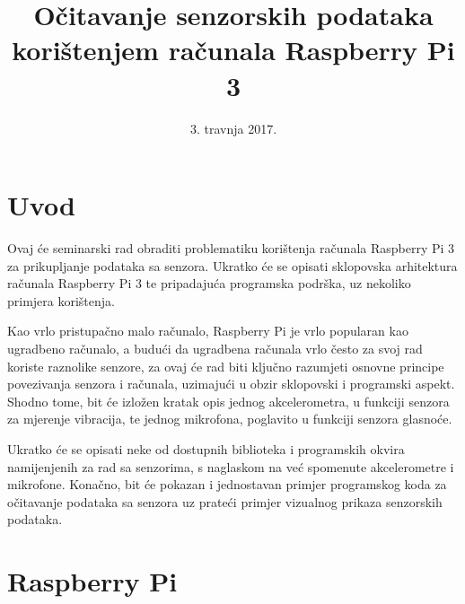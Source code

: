 \documentclass[12pt,a4paper]{article}
\begin{document}
	\title{Očitavanje senzorskih podataka korištenjem računala Raspberry Pi 3}


	\date{\vspace{-5ex} 3. travnja 2017.}
	\maketitle

	\tableofcontents
	\newpage

\section{Uvod}
Ovaj će seminarski rad obraditi problematiku korištenja računala Raspberry Pi 3 za prikupljanje podataka sa senzora. Ukratko će se opisati sklopovska arhitektura računala Raspberry Pi 3 te pripadajuća programska podrška, uz nekoliko primjera korištenja. \\ \par
Kao vrlo pristupačno malo računalo, Raspberry Pi je vrlo popularan kao ugradbeno računalo, a budući da ugradbena računala vrlo često za svoj rad koriste raznolike senzore, za ovaj će rad biti ključno razumjeti osnovne principe povezivanja senzora i računala, uzimajući u obzir sklopovski i programski aspekt. Shodno tome, bit će izložen kratak opis jednog akcelerometra, u funkciji senzora za mjerenje vibracija, te jednog mikrofona, poglavito u funkciji senzora glasnoće. \\ \par
Ukratko će se opisati neke od dostupnih biblioteka i programskih okvira namijenjenih za rad sa senzorima, s naglaskom na već spomenute akcelerometre i mikrofone. Konačno, bit će pokazan i jednostavan primjer programskog koda za očitavanje podataka sa senzora uz prateći primjer vizualnog prikaza senzorskih podataka. \\
\newpage


\section{Raspberry Pi}
\end{document}
